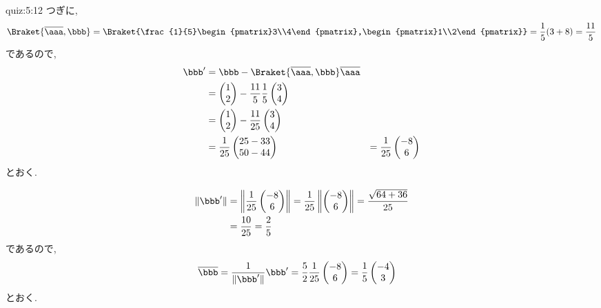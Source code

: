 \begin{answerof}{quiz:5:12}
  つぎに,
  \begin{align*}
    \Braket{\overline \aaa,\bbb}=\Braket{\frac{1}{5}\begin{pmatrix}3\\4\end{pmatrix},\begin{pmatrix}1\\2\end{pmatrix}}
    =\frac{1}{5}(3+8)=\frac{11}{5}
  \end{align*}
  であるので,
  \begin{align*}
    \bbb'
    &=\bbb-\Braket{\overline{\aaa},\bbb}\overline{\aaa}\\
    &=
    \begin{pmatrix}1\\2\end{pmatrix}-\frac{11}{5}\frac{1}{5}\begin{pmatrix}3\\4\end{pmatrix}\\
    &=
    \begin{pmatrix}1\\2\end{pmatrix}-\frac{11}{25}\begin{pmatrix}3\\4\end{pmatrix}\\
    &=
    \frac{1}{25}\begin{pmatrix}25-33\\50-44\end{pmatrix}
    &=
    \frac{1}{25}\begin{pmatrix}-8\\6\end{pmatrix}
  \end{align*}
  とおく.

  \begin{align*}
    \|\bbb'\|
    &=\left\|\frac{1}{25}\begin{pmatrix}-8\\6\end{pmatrix}\right\|
    =\frac{1}{25}\left\|\begin{pmatrix}-8\\6\end{pmatrix}\right\|
    =\frac{\sqrt{64+36}}{25}\\
    &=\frac{10}{25}
    =\frac{2}{5}
  \end{align*}
  であるので,
  \begin{align*}
    \overline{\bbb}
    &=\frac{1}{\|\bbb'\|}\bbb'
    =\frac{5}{2}\frac{1}{25}\begin{pmatrix}-8\\6\end{pmatrix}
    =\frac{1}{5}\begin{pmatrix}-4\\3\end{pmatrix}
  \end{align*}
  とおく.


\end{answerof}
